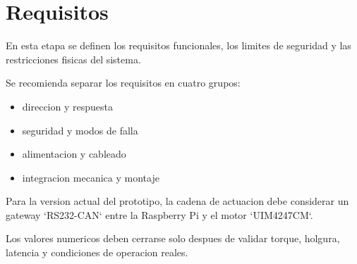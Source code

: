 \chapter{Requisitos}

En esta etapa se definen los requisitos funcionales, los limites de seguridad y las restricciones fisicas del sistema.

Se recomienda separar los requisitos en cuatro grupos:

\begin{itemize}
  \item direccion y respuesta
  \item seguridad y modos de falla
  \item alimentacion y cableado
  \item integracion mecanica y montaje
\end{itemize}

Para la version actual del prototipo, la cadena de actuacion debe considerar un
gateway `RS232-CAN` entre la Raspberry Pi y el motor `UIM4247CM`.

Los valores numericos deben cerrarse solo despues de validar torque, holgura, latencia y condiciones de operacion reales.
